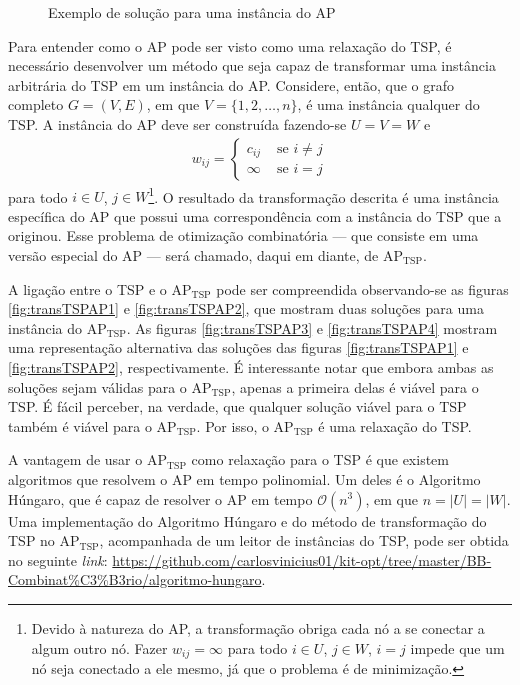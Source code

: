 {\begin{figure}[ht]
\begin{tikzpicture}
\end{tikzpicture}
\caption{Exemplo de solução para uma instância do AP}\label{fig:assignExample1}

\end{figure}

Para entender como o AP pode ser visto como uma relaxação do TSP, é necessário desenvolver um método que seja capaz de transformar uma instância arbitrária do TSP em um instância do AP. Considere, então, que o grafo completo $G = (V,E)$, em que $V=\{1,2,\dots,n\}$, é uma instância qualquer do TSP. A instância do AP deve ser construída fazendo-se $U = V = W$ e 
\begin{align*}
w_{ij} = \begin{cases}
	c_{ij} & \text{ se } i \neq j \\
	\infty & \text{ se } i = j
\end{cases}
\end{align*}
para todo $i \in U$, $j \in W$\footnote{Devido à natureza do AP, a transformação obriga cada nó a se conectar a algum outro nó. Fazer $w_{ij} = \infty$ para todo $i \in U$, $j \in W$, $i = j$ impede  que um nó seja conectado a ele mesmo, já que o problema é de minimização.}. O resultado da transformação descrita é uma instância específica do AP que possui uma correspondência com a instância do TSP que a originou. Esse problema de otimização combinatória --- que consiste em uma versão especial do AP --- será chamado, daqui em diante, de $\text{AP}_{\text{TSP}}$.

A ligação entre o TSP e o $\text{AP}_{\text{TSP}}$ pode ser compreendida observando-se as figuras \ref{fig:transTSPAP1} e \ref{fig:transTSPAP2}, que mostram duas soluções para uma instância do $\text{AP}_{\text{TSP}}$. As figuras \ref{fig:transTSPAP3} e \ref{fig:transTSPAP4} mostram uma representação alternativa das soluções das figuras \ref{fig:transTSPAP1} e \ref{fig:transTSPAP2}, respectivamente. É interessante notar que embora ambas as soluções sejam válidas para o $\text{AP}_{\text{TSP}}$, apenas a primeira delas é viável para o TSP. É fácil perceber, na verdade, que qualquer solução viável para o TSP também é viável para o $\text{AP}_{\text{TSP}}$. Por isso, o $\text{AP}_\text{TSP}$ é uma relaxação do TSP.

A vantagem de usar o $\text{AP}_{\text{TSP}}$ como relaxação para o TSP é que existem algoritmos que resolvem o AP em tempo polinomial. Um deles é o Algoritmo Húngaro, que é capaz de resolver o AP em tempo $\mathcal{O}(n^3)$, em que $n = |U| = |W|$. Uma implementação do Algoritmo Húngaro e do método de transformação do TSP no $\text{AP}_{\text{TSP}}$, acompanhada de um leitor de instâncias do TSP, pode ser obtida no seguinte \textit{link}: \url{https://github.com/carlosvinicius01/kit-opt/tree/master/BB-Combinat%C3%B3rio/algoritmo-hungaro}. 


}
